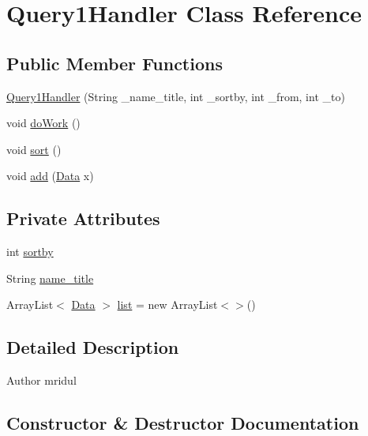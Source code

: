 \hypertarget{class_query1_handler}{}\section{Query1\+Handler Class Reference}
\label{class_query1_handler}
\subsection*{Public Member Functions}
\begin{DoxyCompactItemize}
\item 
\hyperlink{class_query1_handler_ac5a192b72a52acf6999cbfd635bc4362}{Query1\+Handler} (String \+\_\+name\+\_\+title, int \+\_\+sortby, int \+\_\+from, int \+\_\+to)
\item 
void \hyperlink{class_query1_handler_ab3667be62a56c75f35e951d609b9a253}{do\+Work} ()
\item 
void \hyperlink{class_query1_handler_a4e48d3e6ee1d7f644eeb165c980ac1b6}{sort} ()
\item 
void \hyperlink{class_query1_handler_a217ca3f99ec7cc755592185c5a639be1}{add} (\hyperlink{class_data}{Data} x)
\end{DoxyCompactItemize}
\subsection*{Private Attributes}
\begin{DoxyCompactItemize}
\item 
int \hyperlink{class_query1_handler_a3ff52874fd305e4df617cb7b2b66fcc7}{sortby}
\item 
String \hyperlink{class_query1_handler_a28ae63ec11d4898c14edb5a236b2eaf0}{name\+\_\+title}
\item 
Array\+List$<$ \hyperlink{class_data}{Data} $>$ \hyperlink{class_query1_handler_a33fc67d9100cbc74abaaa35ba6f1d90c}{list} = new Array\+List$<$$>$()
\end{DoxyCompactItemize}


\subsection{Detailed Description}
\begin{DoxyAuthor}{Author}
mridul 
\end{DoxyAuthor}


\subsection{Constructor \& Destructor Documentation}
\hypertarget{class_query1_handler_ac5a192b72a52acf6999cbfd635bc4362}{}\label{class_query1_handler_ac5a192b72a52acf6999cbfd635bc4362} 
